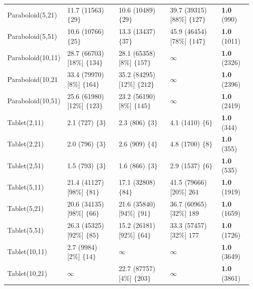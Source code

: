 \documentclass[fontsize=12, a4aper]{scrartcl}
\begin{document}
\begin{table}[H]
\begin{tabularx}{\linewidth}{l l l l l}
			Paraboloid(5,21) & 11.7 (11563) \(\{29\}\) & 10.6 (10489) \(\{29\}\) & 39.7 (39315) [88\%] \(\{127\}\) & \textbf{1.0} (990)\\
			
			Paraboloid(5,51) & 10.6 (10766) \(\{25\}\) & 13.3 (13437) \(\{37\}\) & 45.9 (46454) [78\%] \(\{{147}\}\) & \textbf{1.0} (1011)\\
			
			Paraboloid(10,11) & 28.7 (66703) [18\%] \(\{134\}\) & 28.1 (65358) [8\%] \(\{157\}\) & \(\infty\) & \textbf{1.0} (2326)\\
			
			Paraboloid(10,21 & 33.4 (79970) [8\%] \(\{164\}\) & 35.2 (84295) [12\%] \(\{212\}\) & \(\infty\) & \textbf{1.0} (2396)\\
			
			Paraboloid(10,51) & 25.6 (61980) [12\%] \(\{123\}\) & 23.2 (56190) [8\%] \(\{145\}\) & \(\infty\) & \textbf{1.0} (2419)\\
			
			Tablet(2,11) & 2.1 (727) \(\{3\}\) & 2.3 (806) \(\{3\}\) & 4.1 (1410) \(\{6\}\) & \textbf{1.0} (344)\\
			
			Tablet(2,21) & 2.0 (796) \(\{3\}\) & 2.6 (909) \(\{4\}\) & 4.8 (1700) \(\{8\}\) & \textbf{1.0} (355)\\
			
			Tablet(2,51) & 1.5 (793) \(\{3\}\) & 1.6 (866) \(\{3\}\) & 2.9 (1537) \(\{6\}\) & \textbf{1.0} (535)\\
			
			Tablet(5,11) & 21.4 (41127) [98\%] \(\{81\}\) & 17.1 (32808) \(\{84\}\) & 41.5 (79666) [20\%] \({261}\) & \textbf{1.0} (1919)\\
			
			Tablet(5,21) & 20.6 (34135) [98\%] \(\{66\}\) & 21.6 (35840) [94\%] \(\{91\}\) & 36.7 (60965) [32\%] \({189}\) & \textbf{1.0} (1659)\\
			
			Tablet(5,51) & 26.3 (45325) [92\%] \(\{85\}\) & 15.2 (26181) [92\%] \(\{64\}\) & 33.3 (57457) [32\%] \({177}\) & \textbf{1.0} (1726)\\
			
			Tablet(10,11) & 2.7 (9984) [2\%] \(\{14\}\) & \(\infty\) & \(\infty\)& \textbf{1.0} (3649)\\
			
			Tablet(10,21) & \(\infty\) & 22.7 (87757) [4\%] \(\{203\}\) & \(\infty\)& \textbf{1.0} (3861)\\
			

\end{tabularx}
\end{table}
\end{document}
